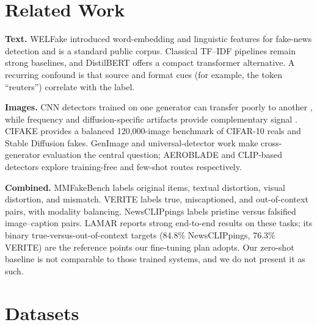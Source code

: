 \documentclass[11pt]{article}
\begin{document}
\section{Related Work}

\textbf{Text.} WELFake \cite{welfake} introduced word-embedding and linguistic features for fake-news detection and is a standard public corpus. Classical TF--IDF pipelines remain strong baselines, and DistilBERT \cite{distilbert} offers a compact transformer alternative. A recurring confound is that source and format cues (for example, the token ``reuters'') correlate with the label.

\textbf{Images.} CNN detectors trained on one generator can transfer poorly to another \cite{wang2020}, while frequency and diffusion-specific artifacts provide complementary signal \cite{frank2020,corvi2023}. CIFAKE \cite{cifake} provides a balanced 120{,}000-image benchmark of CIFAR-10 reals and Stable Diffusion fakes. GenImage \cite{genimage} and universal-detector work \cite{ojha2023} make cross-generator evaluation the central question; AEROBLADE \cite{aeroblade} and CLIP-based detectors \cite{cozzolino2024} explore training-free and few-shot routes respectively.

\textbf{Combined.} MMFakeBench \cite{mmfakebench} labels original items, textual distortion, visual distortion, and mismatch. VERITE \cite{verite} labels true, miscaptioned, and out-of-context pairs, with modality balancing. NewsCLIPpings \cite{newsclippings} labels pristine versus falsified image--caption pairs. LAMAR \cite{lamar} reports strong end-to-end results on these tasks; its binary true-versus-out-of-context targets (84.8\% NewsCLIPpings, 76.3\% VERITE) are the reference points our fine-tuning plan adopts. Our zero-shot baseline is not comparable to those trained systems, and we do not present it as such.

\section{Datasets}
\end{document}
